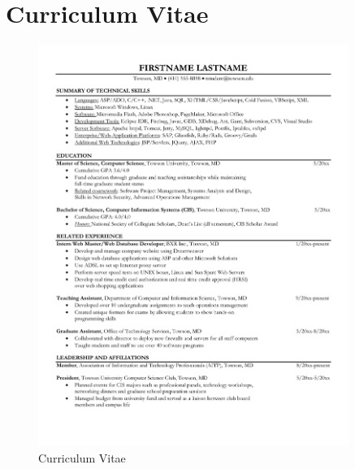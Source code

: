 
\chapter{Curriculum Vitae}\label{sec:curriculum-vitae}

\begin{figure}[H]
    \centering
    \includegraphics[page=1, width=0.9\textwidth]{../docs/applicant/curriculum-vitae.pdf}
    \caption{Curriculum Vitae}
    \label{fig:curriculum-vitae}
\end{figure}

\clearpage
